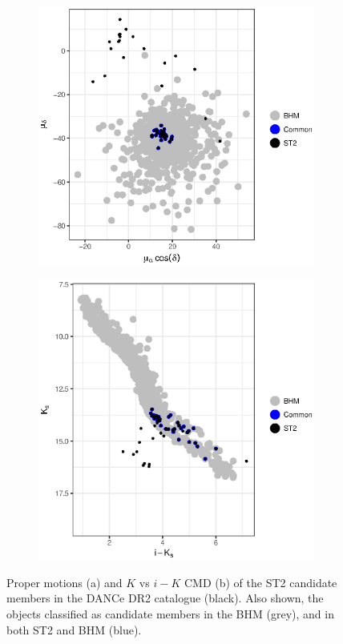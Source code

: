 \begin{figure}[ht!]
    \centering
    \begin{subfigure}[t]{0.45\textwidth}
    \centering
       \includegraphics[width=\textwidth]{background/Figures/ST2_pm.eps}
        \caption{}
    \end{subfigure}
    \begin{subfigure}[t]{0.45\textwidth}
    \centering
     \includegraphics[width=\textwidth]{background/Figures/ST2_ph.eps}
        \caption{}
    \end{subfigure}
\caption{Proper motions (a) and $K$ vs $i-K$ CMD (b) of the ST2 candidate members in the DANCe DR2 catalogue (black). Also shown, the objects classified as candidate members in the BHM (grey), and in  both ST2 and BHM (blue).}
\label{fig:ST2}
\end{figure}

